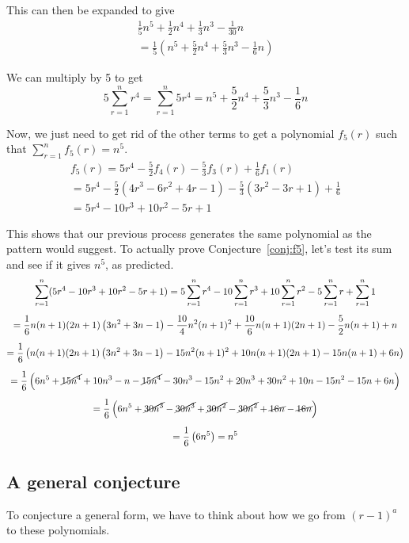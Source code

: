 \documentclass[a4paper]{article}
\newcommand{\sn}{\sum\limits_{r=1}^{n}}
\newcommand{\oo}[1]{\frac{1}{#1}}
\begin{document}
This can then be expanded to give
\begin{gather*}
\oo{5}n^5 + \oo{2}n^4 + \oo{3}n^3 - \oo{30}n\\[0.5em]
= \oo{5}\left(n^5 + \frac{5}{2}n^4 + \frac{5}{3}n^3 - \oo{6}n\right)
\end{gather*}

We can multiply by 5 to get $$5 \sn r^4 = \sn 5r^4 = n^5 + \frac{5}{2}n^4 + \frac{5}{3}n^3 - \oo{6}n$$

Now, we just need to get rid of the other terms to get a polynomial $f_5(r)$ such that $\sn f_5(r) = n^5$.
\begin{gather*}
f_5(r) = 5r^4 - \frac{5}{2}f_4(r) - \frac{5}{3}f_3(r) + \oo{6}f_1(r)\\[0.5em]
= 5r^4 - \frac{5}{2}\left(4r^3 - 6r^2 + 4r - 1\right) - \frac{5}{3}\left(3r^2 - 3r + 1\right) + \oo{6}\\[0.5em]
= 5r^4 - 10r^3 + 10r^2 - 5r + 1
\end{gather*}

This shows that our previous process generates the same polynomial as the pattern would suggest. To actually prove Conjecture~\ref{conj:f5}, let's test its sum and see if it gives $n^5$, as predicted.
\begin{gather*}
\sn (5r^4 - 10r^3 + 10r^2 - 5r + 1) = 5 \sn r^4 - 10 \sn r^3 + 10 \sn r^2 - 5 \sn r + \sn 1\\[0.5em]
= \frac{1}{6} n(n + 1)(2n + 1)\left(3n^2 + 3n - 1\right) - \frac{10}{4} n^2(n + 1)^2 + \frac{10}{6} n(n + 1)(2n + 1) - \frac{5}{2} n(n + 1) + n\\[0.5em]
= \frac{1}{6}\left( n(n + 1)(2n + 1)\left(3n^2 + 3n - 1\right) - 15n^2(n + 1)^2 + 10n(n + 1)(2n + 1) - 15n(n+1) + 6n \right)\\[0.5em]
= \frac{1}{6}\left( 6n^5 + \cancel{15n^4} + 10n^3 - n - \cancel{15n^4} - 30n^3 - 15n^2 + 20n^3 + 30n^2 + 10n - 15n^2 - 15n + 6n \right)\\[0.5em]
= \frac{1}{6}\left( 6n^5 + \cancel{30n^3} - \cancel{30n^3} + \cancel{30n^2} - \cancel{30n^2} + \cancel{16n} - \cancel{16n} \right)\\[0.5em]
= \frac{1}{6}\left( 6n^5 \right) = n^5
\end{gather*}

\subsection{A general conjecture}

To conjecture a general form, we have to think about how we go from $(r-1)^a$ to these polynomials.
\end{document}
